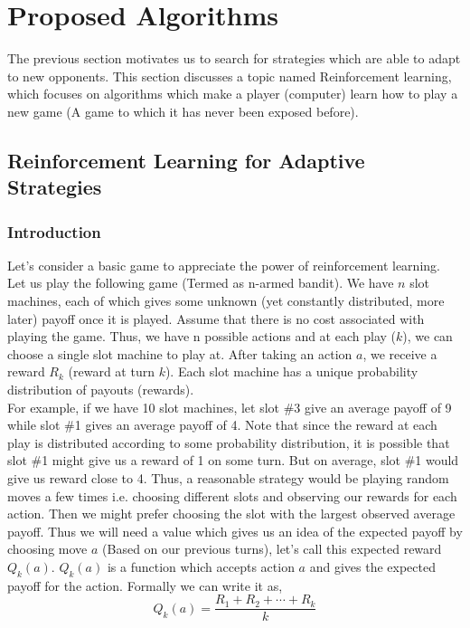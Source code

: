 \documentclass[a4paper]{article}
\begin{document}
	\section{Proposed Algorithms}
	
	The previous section motivates us to search for strategies which are able to adapt to new opponents. This section discusses a topic named Reinforcement learning, which focuses on algorithms which make a player (computer) learn how to play a new game (A game to which it has never been exposed before).
	
	\subsection{Reinforcement Learning for Adaptive Strategies}
	
	\subsubsection{Introduction}
	
	Let's consider a basic game to appreciate the power of reinforcement learning. Let us play the following game (Termed as n-armed bandit). We have $n$ slot machines, each of which gives some unknown (yet constantly distributed, more later) payoff once it is played. Assume that there is no cost associated with playing the game. Thus, we have n possible actions and at each play ($k$), we can choose a single slot machine to play at. After taking an action $a$, we receive a reward $R_{k}$ (reward at turn $k$). Each slot machine has a unique probability distribution of payouts (rewards).\\
	
	For example, if we have 10 slot machines, let slot \#3 give an average payoff of 9 while slot \#1 gives an average payoff of 4. Note that since the reward at each play is distributed according to some probability distribution, it is possible that slot \#1 might give us a reward of 1 on some turn. But on average, slot \#1 would give us reward close to 4. Thus, a reasonable strategy would be playing random moves a few times i.e. choosing different slots and observing our rewards for each action. Then we might prefer choosing the slot with the largest observed average payoff. Thus we will need a value which gives us an idea of the expected payoff by choosing move $a$ (Based on our previous turns), let's call this expected reward $Q_{k}(a)$. $Q_{k}(a)$ is a function which accepts action $a$ and gives the expected payoff for the action. Formally we can write it as,
\begin{equation}
Q_{k}(a) = \frac{R_{1} + R_{2} + \cdots + R_{k}}{k}
\end{equation} 
\end{document}
